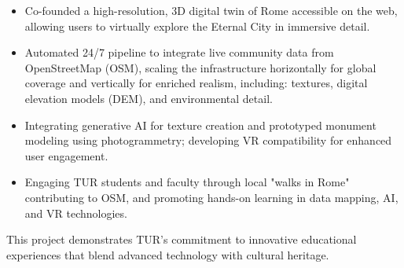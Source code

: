 	\medskip


	\switchcolumn
\fi

\iflongversion

	\begin{itemize}
		\item Co-founded a high-resolution, 3D digital twin of Rome accessible on the web, allowing users to virtually explore the Eternal City in immersive detail.
		\item Automated 24/7 pipeline to integrate live community data from OpenStreetMap (OSM), scaling the infrastructure horizontally for global coverage and vertically for enriched realism, including: textures, digital elevation models (DEM), and environmental detail.
		\item Integrating generative AI for texture creation and prototyped monument modeling using photogrammetry; developing VR compatibility for enhanced user engagement.
		\item Engaging TUR students and faculty through local "walks in Rome" contributing to OSM, and promoting hands-on learning in data mapping, AI, and VR technologies.
	\end{itemize}
	\smallskip
	This project demonstrates TUR's commitment to innovative educational experiences that blend advanced technology with cultural heritage. \\
	\smallskip

	\divider

